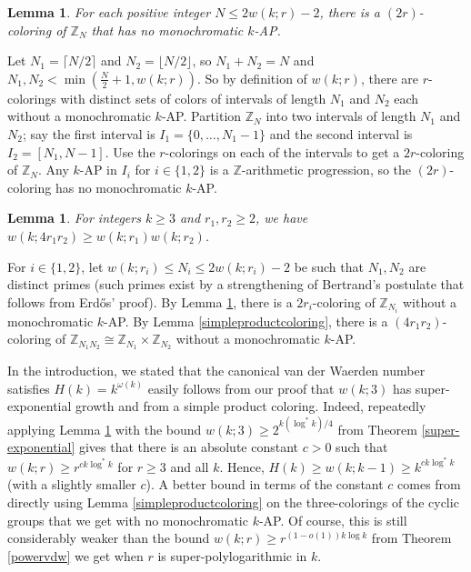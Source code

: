 \documentclass[11pt]{article}
\makeatletter
\numberwithin{equation}{section}
\renewenvironment{proof}[1][\proofname]{\par
  \vspace{-\topsep}%
  \pushQED{\qed}%
  \normalfont
  \topsep0pt \partopsep0pt %
  \trivlist
  \item[\hskip\labelsep
        \itshape
    #1\@addpunct{.}]\ignorespaces
}{%
  \popQED\endtrivlist\@endpefalse
  \addvspace{6pt plus 6pt} %
}
\newtheorem{lem}[result]{Lemma}
\theoremstyle{definition}
\theoremstyle{remark}
\makeatother
\begin{document}
\begin{lem}\label{colorcycfromint}
For each positive integer $N \leq 2w(k;r)-2$, there is a $(2r)$-coloring of $\mathbb{Z}_N$ that has no monochromatic $k$-AP. 
\end{lem}
\begin{proof}
  Let $N_1=\lceil N/2 \rceil$ and $N_2=\lfloor N/2 \rfloor$, so $N_1+N_2=N$ and $N_1,N_2<\min(\frac{N}{2}+1,w(k;r))$. So by definition of $w(k;r)$, there are $r$-colorings with distinct sets of colors of intervals of length $N_1$ and $N_2$ each without a monochromatic $k$-AP. Partition $\mathbb{Z}_N$ into two intervals of length $N_1$ and $N_2$; say the first interval is $I_1=\{0,\ldots,N_1-1\}$ and the second interval is $I_2=[N_1,N-1]$. Use the $r$-colorings on each of the intervals to get a $2r$-coloring of $\mathbb{Z}_N$. Any $k$-AP in $I_i$ for $i \in \{1,2\}$ is a $\mathbb{Z}$-arithmetic progression, so the $(2r)$-coloring has no monochromatic $k$-AP. 
\end{proof}

\begin{lem}\label{productvdwbound}
For integers $k \geq 3$ and $r_1,r_2 \geq 2$, we have $w(k;4r_1r_2) \geq w(k;r_1)w(k;r_2)$.
\end{lem}
\begin{proof}
For $i \in \{1,2\}$, let $w(k;r_i) \leq N_i \leq 2w(k;r_i)-2$ be such that $N_1,N_2$ are distinct primes (such primes exist by a strengthening of Bertrand's postulate that follows from Erd\H{o}s' proof). By Lemma \ref{colorcycfromint}, there is a $2r_i$-coloring of $\mathbb{Z}_{N_i}$ without a monochromatic $k$-AP. By Lemma \ref{simpleproductcoloring}, there is a $(4r_1r_2)$-coloring of $\mathbb{Z}_{N_1N_2}\cong \mathbb{Z}_{N_1} \times \mathbb{Z}_{N_2}$ without a monochromatic $k$-AP. 
\end{proof}

In the introduction, we stated that the canonical van der Waerden number satisfies $H(k) = k^{\omega(k)}$ easily follows from our proof that $w(k;3)$ has super-exponential growth and from a simple product coloring. 
Indeed, repeatedly applying Lemma \ref{productvdwbound} with the bound $w(k;3) \geq 2^{k(\log^* k)/4}$ from Theorem \ref{super-exponential} gives that there is an absolute constant $c>0$ such that $w(k;r) \geq r^{ck \log^* k}$ for $r \geq 3$ and all $k$. Hence, $H(k) \geq w(k;k-1) \geq k^{ck \log^* k}$ (with a slightly smaller $c$). A better bound in terms of the constant $c$ comes from directly using Lemma \ref{simpleproductcoloring} on the three-colorings of the cyclic groups that we get with no monochromatic $k$-AP. Of course, this is still considerably weaker than the bound $w(k;r) \geq r^{(1-o(1))k\log k}$ from Theorem \ref{powervdw} we get when $r$ is super-polylogarithmic in $k$. 
\end{document}
